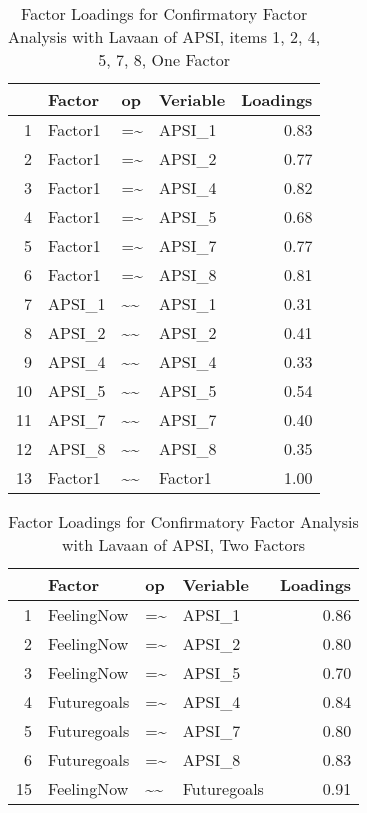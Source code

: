 \documentclass{article}\usepackage[]{graphicx}\usepackage[]{color}
\begin{document}
\begin{table}[ht]
\centering
\begin{tabular}{rlllr}
  \hline
 & Factor & op & Veriable & Loadings \\ 
  \hline
1 & Factor1 & =\~{} & APSI\_1 & 0.83 \\ 
  2 & Factor1 & =\~{} & APSI\_2 & 0.77 \\ 
  3 & Factor1 & =\~{} & APSI\_4 & 0.82 \\ 
  4 & Factor1 & =\~{} & APSI\_5 & 0.68 \\ 
  5 & Factor1 & =\~{} & APSI\_7 & 0.77 \\ 
  6 & Factor1 & =\~{} & APSI\_8 & 0.81 \\ 
  7 & APSI\_1 & \~{}\~{} & APSI\_1 & 0.31 \\ 
  8 & APSI\_2 & \~{}\~{} & APSI\_2 & 0.41 \\ 
  9 & APSI\_4 & \~{}\~{} & APSI\_4 & 0.33 \\ 
  10 & APSI\_5 & \~{}\~{} & APSI\_5 & 0.54 \\ 
  11 & APSI\_7 & \~{}\~{} & APSI\_7 & 0.40 \\ 
  12 & APSI\_8 & \~{}\~{} & APSI\_8 & 0.35 \\ 
  13 & Factor1 & \~{}\~{} & Factor1 & 1.00 \\ 
   \hline
\end{tabular}
\caption{Factor Loadings for Confirmatory Factor Analysis with Lavaan of APSI, items 1, 2, 4, 5, 7, 8, One Factor} 
\end{table}

\begin{table}[ht]
\centering
\begin{tabular}{rlllr}
  \hline
 & Factor & op & Veriable & Loadings \\ 
  \hline
1 & FeelingNow & =\~{} & APSI\_1 & 0.86 \\ 
  2 & FeelingNow & =\~{} & APSI\_2 & 0.80 \\ 
  3 & FeelingNow & =\~{} & APSI\_5 & 0.70 \\ 
  4 & Futuregoals & =\~{} & APSI\_4 & 0.84 \\ 
  5 & Futuregoals & =\~{} & APSI\_7 & 0.80 \\ 
  6 & Futuregoals & =\~{} & APSI\_8 & 0.83 \\ 
  15 & FeelingNow & \~{}\~{} & Futuregoals & 0.91 \\ 
   \hline
\end{tabular}
\caption{Factor Loadings for Confirmatory Factor Analysis with Lavaan of APSI, Two Factors} 
\end{table}
\end{document}
